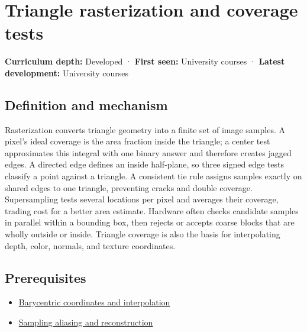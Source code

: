 \hypertarget{appendix-ed3f9bc298fe}{}\label{referencestart:appendix-ed3f9bc298fe}
\section{Triangle rasterization and coverage tests}\label{appendix-ed3f9bc298fe-triangle-rasterization-and-coverage-tests}

\textbf{Curriculum depth:} Developed · \textbf{First seen:} University courses · \textbf{Latest development:} University courses

\begin{allmightroledefinition}

\subsection{Definition and mechanism}\label{appendix-ed3f9bc298fe-definition-and-mechanism}

Rasterization converts triangle geometry into a finite set of image samples. A pixel's ideal coverage is the area fraction inside the triangle; a center test approximates this integral with one binary answer and therefore creates jagged edges. A directed edge defines an inside half-plane, so three signed edge tests classify a point against a triangle. A consistent tie rule assigns samples exactly on shared edges to one triangle, preventing cracks and double coverage. Supersampling tests several locations per pixel and averages their coverage, trading cost for a better area estimate. Hardware often checks candidate samples in parallel within a bounding box, then rejects or accepts coarse blocks that are wholly outside or inside. Triangle coverage is also the basis for interpolating depth, color, normals, and texture coordinates.

\end{allmightroledefinition}

\subsection{Prerequisites}\label{appendix-ed3f9bc298fe-prerequisites}

\begin{itemize}
\tightlist
\item
  \hyperref[appendix-02b9d9a81dca]{Barycentric coordinates and interpolation}
\item
  \hyperref[appendix-6a7869dd79a6]{Sampling aliasing and reconstruction}
\end{itemize}

